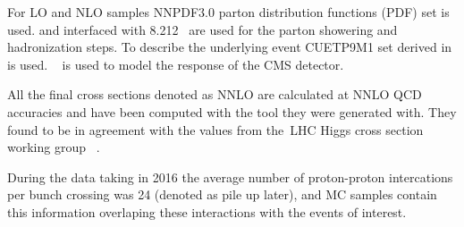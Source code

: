 For LO and NLO samples NNPDF3.0 parton distribution functions (PDF)
set is used. {\POWHEG} and {\MADGRAPH} interfaced with
{\PYTHIA}8.212~\cite{Sjostrand:2007gs} are used for the parton
showering and hadronization steps. To describe the underlying event
CUETP9M1 set derived in \cite{Khachatryan:2015pea} is
used. \GEANTfour~\cite{GEANT4} is used to model the response of the
CMS detector.

All the final cross sections denoted as NNLO are calculated at NNLO QCD accuracies and have been computed with the tool they were generated with. They found to be in agreement with the values from the\
 LHC Higgs cross section working group ~\cite{LHCHXSWG, xsecZH, xsecTT, xsecST, xsecVV}.

During the data taking in 2016 the average number of proton-proton intercations per bunch crossing was 24 (denoted as pile up later), and MC samples contain this information overlaping these interactions with the events of interest.



